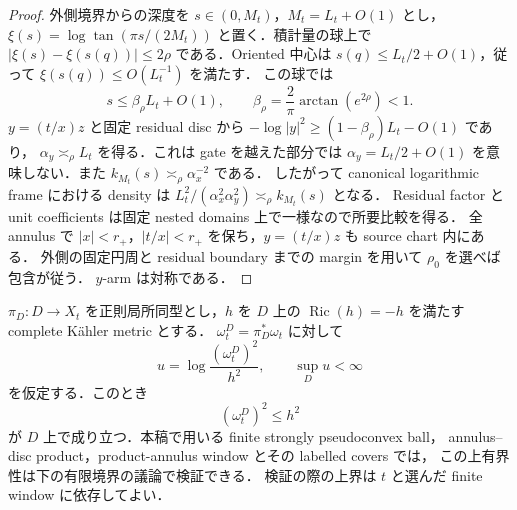 \documentclass[a4paper,11pt]{ltjsarticle}
\numberwithin{equation}{section}
\theoremstyle{plain}
\theoremstyle{definition}
\theoremstyle{remark}
\newcommand{\Ric}{\operatorname{Ric}}\newcommand{\tr}{\operatorname{tr}}\newcommand{\osc}{\operatorname{osc}}\newcommand{\vol}{\operatorname{Vol}}
\begin{document}
\begin{proof}
外側境界からの深度を $s\in(0,M_t)$，$M_t=L_t+O(1)$ とし，
$\xi(s)=\log\tan(\pi s/(2M_t))$ と置く．積計量の球上で
$|\xi(s)-\xi(s(q))|\le2\rho$ である．Oriented 中心は
$s(q)\le L_t/2+O(1)$，従って $\xi(s(q))\le O(L_t^{-1})$ を満たす．
この球では
\[
 s\le\beta_\rho L_t+O(1),\qquad
 \beta_\rho=\frac2\pi\arctan(e^{2\rho})<1.
\]
$y=(t/x)z$ と固定 residual disc から
$-\log|y|^2\ge(1-\beta_\rho)L_t-O(1)$ であり，
$\alpha_y\asymp_\rho L_t$ を得る．これは gate を越えた部分では
$\alpha_y=L_t/2+O(1)$ を意味しない．また
$k_{M_t}(s)\asymp_\rho\alpha_x^{-2}$ である．
したがって canonical logarithmic frame における density は
$L_t^2/(\alpha_x^2\alpha_y^2)\asymp_\rho k_{M_t}(s)$ となる．
Residual factor と unit coefficients は固定 nested domains 上で一様なので所要比較を得る．
全 annulus で $|x|<r_+$，$|t/x|<r_+$ を保ち，$y=(t/x)z$ も source chart 内にある．
外側の固定円周と residual boundary までの margin を用いて $\rho_0$ を選べば包含が従う．
$y$-arm は対称である．
\end{proof}

\begin{lemma}\label{coarse:lem:complete-volume-upper}
$\pi_D:D\to X_t$ を正則局所同型とし，$h$ を $D$ 上の
$\Ric(h)=-h$ を満たす complete K\"ahler metric とする．
$\omega_t^D=\pi_D^*\omega_t$ に対して
\[
 u=\log\frac{(\omega_t^D)^2}{h^2},\qquad \sup_Du<\infty
\]
を仮定する．このとき
\[
 (\omega_t^D)^2\le h^2
\]
が $D$ 上で成り立つ．本稿で用いる finite strongly pseudoconvex ball，
annulus--disc product，product-annulus window とその labelled covers では，
この上有界性は下の有限境界の議論で検証できる．
検証の際の上界は $t$ と選んだ finite window に依存してよい．
\end{lemma}
\end{document}

